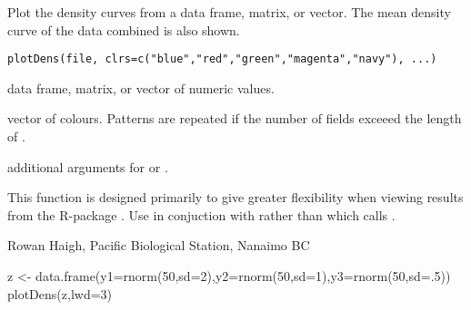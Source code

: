 \documentclass[letterpaper]{book}
\begin{document}
\begin{Description}\relax
Plot the density curves from a data frame, matrix, or vector. 
The mean density curve of the data combined is also shown.
\end{Description}
\begin{Usage}
\begin{verbatim}
plotDens(file, clrs=c("blue","red","green","magenta","navy"), ...)  
\end{verbatim}
\end{Usage}
\begin{Arguments}
\begin{ldescription}
\item[\code{file}] data frame, matrix, or vector of numeric values.
\item[\code{clrs}] vector of colours. Patterns are repeated if the number 
of fields exceeed the length of .
\item[\code{...}] additional arguments for  or .
\end{ldescription}
\end{Arguments}
\begin{Details}\relax
This function is designed primarily to give greater flexibility when viewing 
results from the R-package . Use  in conjuction with 
 rather than  
which calls .
\end{Details}
\begin{Author}\relax
Rowan Haigh, Pacific Biological Station, Nanaimo BC
\end{Author}
\begin{Examples}
\begin{ExampleCode}
z <- data.frame(y1=rnorm(50,sd=2),y2=rnorm(50,sd=1),y3=rnorm(50,sd=.5))
plotDens(z,lwd=3)
\end{ExampleCode}
\end{Examples}
\end{document}
